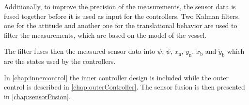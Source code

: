 Additionally, to improve the precision of the measurements, the sensor data is fused together before it is used as input for the controllers. Two Kalman filters, one for the attitude and another one for the translational behavior are used to filter the measurements, which are based on the model of the vessel. 
 
The filter fuses then the measured sensor data into $\psi$, $\dot{\psi}$, $x_\mathrm{n}$, $y_\mathrm{n}$, $\dot{x}_\mathrm{b}$ and $\dot{y}_\mathrm{b}$ which are the states used by the controllers. 

In \autoref{chap:innercontrol} the inner controller design is included while the outer control is described in \autoref{chap:outerController}. The sensor fusion is then presented in \autoref{chap:sensorFusion}.


